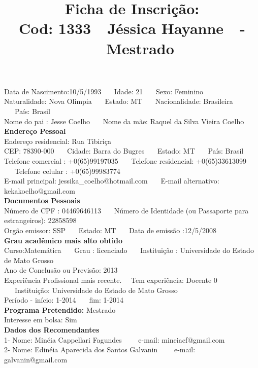 \documentclass[11pt]{article}
\title{\vspace*{-4cm} Ficha de Inscrição: \\Cod: 1333\ \ Jéssica  Hayanne\ \ - \ \ Mestrado 
 }
\date{}
\begin{document}
\maketitle
\vspace*{-1.5cm}
\noindent Data de Nascimento:10/5/1993
\ \ \ Idade: 21   \ \ \ Sexo: Feminino
\\
Naturalidade: Nova Olimpia  
\ \ \  Estado: MT
\ \ \  Nacionalidade: Brasileira
\ \ \ País: Brasil
\\        
Nome do pai : Jesse Coelho
\ \ \ Nome da mãe: Raquel da Silva Vieira Coelho          
\\[0.2cm]                     
\textbf{Endereço Pessoal} 
\\ 
\noindent Endereço residencial: Rua Tibiriça
\\
        CEP: 78390-000 
\ \ \ Cidade: Barra do Bugres 
\ \ \ Estado: MT 
\ \ \ País: Brasil
\\		
		Telefone comercial : +0(65)99197035
\ \ \ Telefone residencial: +0(65)33613099
\ \ \ Telefone celular : +0(65)99983774
\\
E-mail principal: jessika\_coelho@hotmail.com
\ \ \ E-mail alternativo: kekakoelho@gmail.com 
\\[0.2cm] 
\textbf{Documentos Pessoais}
\\
\noindent Número de CPF : 04469646113
\ \ \ Número de Identidade (ou Passaporte para estrangeiros): 22858598
\\
Orgão emissor: SSP
\ \ \ Estado: MT
\ \ \ Data de emissão :12/5/2008
\\[0.3cm]
\textbf{Grau acadêmico mais alto obtido}
\\	
Curso:Matemática
\ \ \ Grau : licenciado
\ \ \ Instituição : Universidade do Estado de Mato Grosso
\\			
Ano de Conclusão ou Previsão: 2013
\\ 
Experiência Profissional mais recente. \ \  
Tem experiência: Docente 0  
\ \ \ Instituição: Universidade do Estado de Mato Grosso
\\  
Período - início: 1-2014
\ \ \ fim: 1-2014
\\[0.2cm] 
\textbf{Programa Pretendido:} Mestrado\\
Interesse em bolsa: Sim
\\[0.3cm]		
\textbf{Dados dos Recomendantes} 
\\
1- Nome: Minéia Cappellari Fagundes
\ \ \ \  e-mail: mineiacf@gmail.com 
\\
2- Nome: Edinéia Aparecida dos Santos Galvanin
\ \ \ \ e-mail: galvanin@gmail.com
\end{document}
